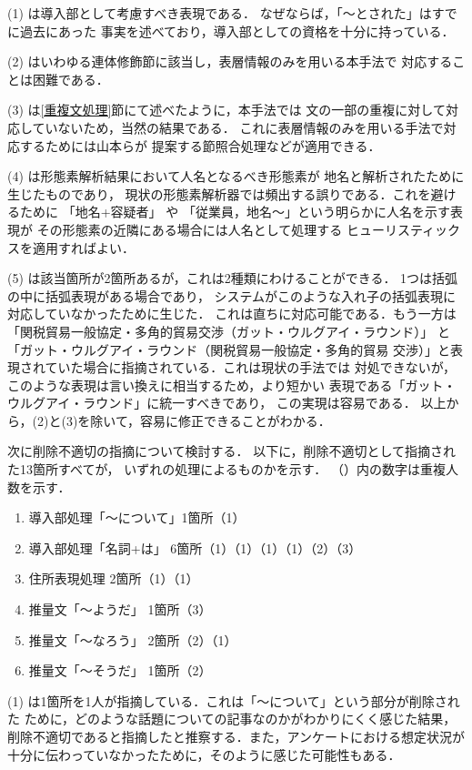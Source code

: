 (1) は導入部として考慮すべき表現である．
なぜならば，「〜とされた」はすでに過去にあった
事実を述べており，導入部としての資格を十分に持っている．

(2) はいわゆる連体修飾節に該当し，表層情報のみを用いる本手法で
対応することは困難である．

(3) は\ref{重複文処理}節にて述べたように，本手法では
文の一部の重複に対して対応していないため，当然の結果である．
これに表層情報のみを用いる手法で対応するためには山本らが
提案する節照合処理\cite{Yamamoto96}などが適用できる．

(4) は形態素解析結果において人名となるべき形態素が
地名と解析されたために生じたものであり，
現状の形態素解析器では頻出する誤りである．これを避けるために
「地名+容疑者」 や 「従業員，地名〜」という明らかに人名を示す表現が
その形態素の近隣にある場合には人名として処理する
ヒューリスティックスを適用すればよい．

(5) は該当箇所が2箇所あるが，これは2種類にわけることができる．
1つは括弧の中に括弧表現がある場合であり，
システムがこのような入れ子の括弧表現に対応していなかったために生じた．
これは直ちに対応可能である．もう一方は
「関税貿易一般協定・多角的貿易交渉（ガット・ウルグアイ・ラウンド）」
と「ガット・ウルグアイ・ラウンド（関税貿易一般協定・多角的貿易
交渉）」と表現されていた場合に指摘されている．これは現状の手法では
対処できないが，このような表現は言い換えに相当するため，より短かい
表現である「ガット・ウルグアイ・ラウンド」に統一すべきであり，
この実現は容易である．
以上から，(2)と(3)を除いて，容易に修正できることがわかる．

次に削除不適切の指摘について検討する．
以下に，削除不適切として指摘された13箇所すべてが，
いずれの処理によるものかを示す．
（）内の数字は重複人数を示す．

\begin{enumerate}
 \item 導入部処理「〜について」1箇所（1）
 \item 導入部処理「名詞+は」 6箇所（1）（1）（1）（1）（2）（3）
 \item 住所表現処理 2箇所（1）（1）
 \item 推量文「〜ようだ」 1箇所（3）
 \item 推量文「〜なろう」 2箇所（2）（1）
 \item 推量文「〜そうだ」 1箇所（2）
\end{enumerate}

(1) は1箇所を1人が指摘している．これは「〜について」という部分が削除された
ために，どのような話題についての記事なのかがわかりにくく感じた結果，
削除不適切であると指摘したと推察する．また，アンケートにおける想定状況が
十分に伝わっていなかったために，そのように感じた可能性もある．

